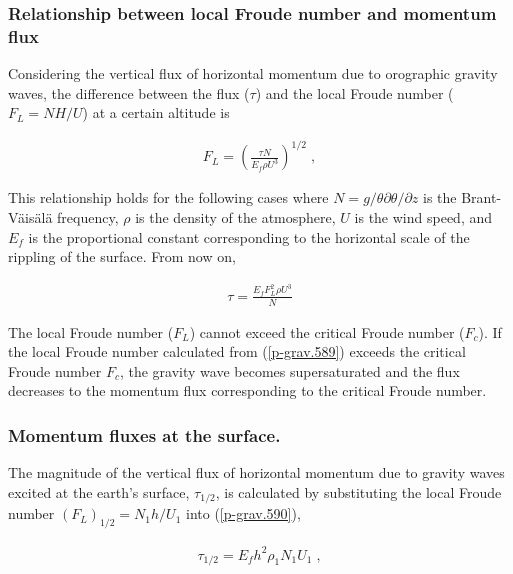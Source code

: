 \hypertarget{relationship-between-local-froude-number-and-momentum-flux}{%
\subsubsection{Relationship between local Froude number and momentum
flux}\label{relationship-between-local-froude-number-and-momentum-flux}}

Considering the vertical flux of horizontal momentum due to orographic
gravity waves, the difference between the flux (\(\tau\)) and the local
Froude number (\(F_L = NH/U\)) at a certain altitude is

\begin{eqnarray}
   F_L = \left(
            \frac{\tau N}{E_f \rho U^3}
           \right)^{1/2} \; , \label{p-grav.589}
\end{eqnarray}

This relationship holds for the following cases where
\(N = g/\theta \partial \theta/\partial z\) is the Brant-Väisälä
frequency, \(\rho\) is the density of the atmosphere, \(U\) is the wind
speed, and \(E_f\) is the proportional constant corresponding to the
horizontal scale of the rippling of the surface. From now on,

\begin{eqnarray}
  \tau = \frac{E_f F_L^2 \rho U^3}{N} \label{p-grav.590}
\end{eqnarray}

The local Froude number (\(F_L\)) cannot exceed the critical Froude
number (\(F_{c}\)). If the local Froude number calculated from
(\ref{p-grav.589}) exceeds the critical Froude number \(F_{c}\),
the gravity wave becomes supersaturated and the flux decreases to the
momentum flux corresponding to the critical Froude number.

\hypertarget{momentum-fluxes-at-the-surface.}{%
\subsubsection{Momentum fluxes at the
surface.}\label{momentum-fluxes-at-the-surface.}}

The magnitude of the vertical flux of horizontal momentum due to gravity
waves excited at the earth's surface, \(\tau_{1/2}\), is calculated by
substituting the local Froude number \((F_L)_{1/2} = N_1 h/U_1\) into
(\ref{p-grav.590}),

\begin{eqnarray}
  \tau_{1/2} = E_f h^2 \rho_1 N_1 U_1 \; ,
\end{eqnarray}

